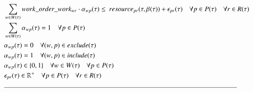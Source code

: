 \begin{alignat}{2}
	& \sum_{\ElementWorkOrder \in \SetWorkOrder{}} \ParStrategicWorkOrderWeight \cdot \VarStrategicWorkOrderAssignment{\ElementWorkOrder}{\ElementPeriod} \leq \ \ParStrategicResource + \VarStrategicExcess                                                                           \quad \forall \ElementPeriod \in \SetPeriod \quad \forall \ElementResource \in \SetResource                                \label{eqn:constraint:strategic:resource}\\
	& \sum_{\ElementWorkOrder \in \SetWorkOrder{}} \VarStrategicWorkOrderAssignment{\ElementWorkOrder}{\ElementPeriod} = 1              \quad \forall \ElementPeriod \in \SetPeriod                                                                                                                                                                                                                               \label{eqn:constraint:strategic:schedule_once}\\
	& \VarStrategicWorkOrderAssignment{\ElementWorkOrder}{\ElementPeriod} = 0                                                            \quad \forall (\ElementWorkOrder, \ElementPeriod) \in \ParStrategicExclude                                                                                                                                                                                               \label{eqn:constraint:strategic:include}\\
	& \VarStrategicWorkOrderAssignment{\ElementWorkOrder}{\ElementPeriod} = 1                                                            \quad \forall (\ElementWorkOrder, \ElementPeriod) \in \ParStrategicInclude                                                                                                                                                                                               \label{eqn:constraint:strategic:exclude}\\
	& \VarStrategicWorkOrderAssignment{\ElementWorkOrder}{\ElementPeriod} \in \{0, 1\}                                                   \quad \forall \ElementWorkOrder \in \SetWorkOrder{} \quad \forall \ElementPeriod \in \SetPeriod                                                                                                                                                                           \label{eqn:variable:strategic:assignment}      \\ 
	& \VarStrategicExcess \in \mathbb{R}^{+}                                                                                             \quad \forall \ElementPeriod \in \SetPeriod \quad \forall \ElementResource \in \SetResource                                                                                                                                                                               \label{eqn:variable:strateigc:penalty}\\ 
	& \text{\rule{\linewidth}{0.4pt}} \notag
\end{alignat}
